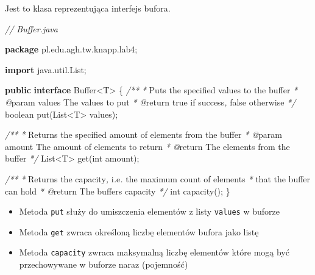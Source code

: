 \documentclass[11pt]{article}
\providecommand{\tightlist}{%
      \setlength{\itemsep}{0pt}\setlength{\parskip}{0pt}}
\newenvironment{Shaded}{}{}
\newcommand{\KeywordTok}[1]{\textcolor[rgb]{0.00,0.44,0.13}{\textbf{{#1}}}}
\newcommand{\DataTypeTok}[1]{\textcolor[rgb]{0.56,0.13,0.00}{{#1}}}
\newcommand{\CommentTok}[1]{\textcolor[rgb]{0.38,0.63,0.69}{\textit{{#1}}}}
\newcommand{\FunctionTok}[1]{\textcolor[rgb]{0.02,0.16,0.49}{{#1}}}
\newcommand{\NormalTok}[1]{{#1}}
\newcommand{\ImportTok}[1]{{#1}}
\newcommand{\OperatorTok}[1]{\textcolor[rgb]{0.40,0.40,0.40}{{#1}}}
\newcommand{\BuiltInTok}[1]{{#1}}
\begin{document}
Jest to klasa reprezentująca interfejs bufora.

\begin{Shaded}
\begin{Highlighting}[]
\CommentTok{// Buffer.java}

\KeywordTok{package}\ImportTok{ pl}\OperatorTok{.}\ImportTok{edu}\OperatorTok{.}\ImportTok{agh}\OperatorTok{.}\ImportTok{tw}\OperatorTok{.}\ImportTok{knapp}\OperatorTok{.}\ImportTok{lab4}\OperatorTok{;}

\KeywordTok{import} \ImportTok{java}\OperatorTok{.}\ImportTok{util}\OperatorTok{.}\ImportTok{List}\OperatorTok{;}

\KeywordTok{public} \KeywordTok{interface} \BuiltInTok{Buffer}\OperatorTok{\textless{}}\NormalTok{T}\OperatorTok{\textgreater{}} \OperatorTok{\{}
    \CommentTok{/**}
     \CommentTok{*}\NormalTok{ Puts the specified values to the buffer}
\CommentTok{     * @}\NormalTok{param values The values to put}
     \CommentTok{*} \CommentTok{@}\NormalTok{return }\CommentTok{\textasciigrave{}}\NormalTok{true}\CommentTok{\textasciigrave{}}\NormalTok{ if success}\CommentTok{,} \CommentTok{\textasciigrave{}}\NormalTok{false}\CommentTok{\textasciigrave{}}\NormalTok{ otherwise}
     \CommentTok{*/}
    \DataTypeTok{boolean} \FunctionTok{put}\OperatorTok{(}\BuiltInTok{List}\OperatorTok{\textless{}}\NormalTok{T}\OperatorTok{\textgreater{}}\NormalTok{ values}\OperatorTok{);}

    \CommentTok{/**}
     \CommentTok{*}\NormalTok{ Returns the specified amount of elements from the buffer}
\CommentTok{     * @}\NormalTok{param amount The amount of elements to return}
     \CommentTok{*} \CommentTok{@}\NormalTok{return The elements from the buffer}
     \CommentTok{*/}
    \BuiltInTok{List}\OperatorTok{\textless{}}\NormalTok{T}\OperatorTok{\textgreater{}} \FunctionTok{get}\OperatorTok{(}\DataTypeTok{int}\NormalTok{ amount}\OperatorTok{);}

    \CommentTok{/**}
     \CommentTok{*}\NormalTok{ Returns the capacity}\CommentTok{,}\NormalTok{ i}\CommentTok{.}\NormalTok{e}\CommentTok{.}\NormalTok{ the maximum count of elements}
     \CommentTok{*}\NormalTok{ that the buffer can hold}
\CommentTok{     * @}\NormalTok{return The buffer}\CommentTok{\textquotesingle{}}\NormalTok{s capacity}
     \CommentTok{*/}
    \DataTypeTok{int} \FunctionTok{capacity}\OperatorTok{();}
\OperatorTok{\}}
\end{Highlighting}
\end{Shaded}

\begin{itemize}
\tightlist
\item
  Metoda \texttt{put} służy do umiszczenia elementów z listy
  \texttt{values} w buforze
\item
  Metoda \texttt{get} zwraca określoną liczbę elementów bufora jako
  listę
\item
  Metoda \texttt{capacity} zwraca maksymalną liczbę elementów które mogą
  być przechowywane w buforze naraz (pojemność)
\end{itemize}
\end{document}
